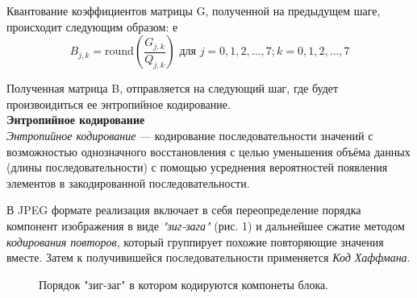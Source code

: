\documentclass{matmex-diploma-custom}
\begin{document}
Квантование коэффициентов матрицы  G, полученной на предыдущем шаге, происходит следующим образом:
е
$$B_{j,k} = \mathrm{round} \left( \frac{G_{j,k}}{Q_{j,k}} \right) \mbox{ для } j=0,1,2,\ldots,7; k=0,1,2,\ldots,7$$


  Полученная матрица B, отправляется на следующий шаг, где будет произвоидиться ее энтропийное кодирование.\\

\textbf{Энтропийное кодирование}\\

\emph{Энтропийное кодирование} — кодирование последовательности значений с возможностью однозначного восстановления с целью уменьшения объёма данных (длины последовательности) с помощью усреднения вероятностей появления элементов в закодированной последовательности.

 В JPEG формате реализация включает в себя переопределение порядка компонент изображения в виде \emph{"зиг-зага"} (рис. 1) и дальнейшее сжатие методом \emph{кодирования повторов}, который группирует похожие повторяющие значения вместе. Затем к получивишейся последовательности применяется \emph{Код Хаффмана}.\\
    \begin{figure}
      \centering
      \caption{Порядок "зиг-заг" в котором кодируются компонеты блока.}
    \end{figure}
\end{document}
